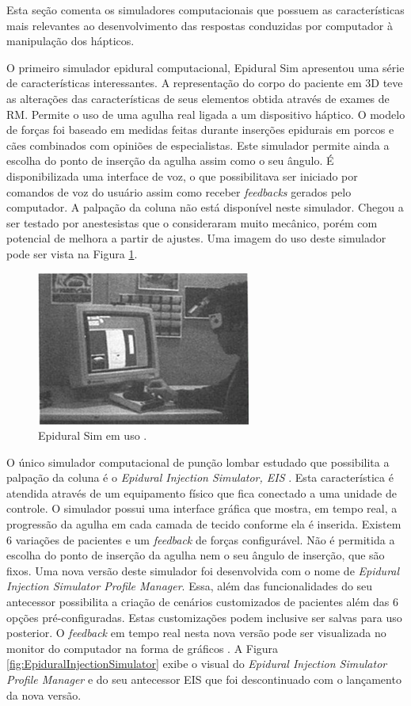 Esta seção comenta os simuladores computacionais que possuem as características mais relevantes ao desenvolvimento das respostas conduzidas por computador à manipulação dos hápticos. 

O primeiro simulador epidural computacional, Epidural Sim \cite{Stredney1996} apresentou uma série de características interessantes. A representação do corpo do paciente em 3D teve as alterações das características de seus elementos obtida através de exames de \acrfull{RM}. Permite o uso de uma agulha real ligada a um dispositivo háptico. O modelo de forças foi baseado em medidas feitas durante inserções epidurais em porcos e cães combinados com opiniões de especialistas. Este simulador permite ainda a escolha do ponto de inserção da agulha assim como o seu ângulo. É disponibilizada uma interface de voz, o que possibilitava ser iniciado por comandos de voz do usuário assim como receber \textit{feedbacks} gerados pelo computador. A palpação da coluna não está disponível neste simulador. Chegou a ser testado por anestesistas que o consideraram muito mecânico, porém com potencial de melhora a partir de ajustes. Uma imagem do uso deste simulador pode ser vista na Figura \ref{fig:epiduralSim}. 

\begin{figure}[ht!]
    \centering
    \includegraphics[width=0.3\linewidth]{capitulos/figuras/epiduralSimulator.png} 
    \caption{Epidural Sim em uso \cite{Stredney1996}.}
    \label{fig:epiduralSim}
\end{figure}

O único simulador computacional de punção lombar estudado que possibilita a palpação da coluna é o \textit{Epidural Injection Simulator, EIS} \cite{Wilson2003}. Esta característica é atendida através de um equipamento físico que fica conectado a uma unidade de controle. O simulador possui uma interface gráfica que mostra, em tempo real, a progressão da agulha em cada camada de tecido conforme ela é inserida. Existem 6 variações de pacientes e um \textit{feedback} de forças configurável. Não é permitida a escolha do ponto de inserção da agulha nem o seu ângulo de inserção, que são fixos. Uma nova versão deste simulador foi desenvolvida com o nome de \textit{Epidural Injection Simulator Profile Manager}. Essa, além das funcionalidades do seu antecessor possibilita a criação de cenários customizados de pacientes além das 6 opções pré-configuradas. Estas customizações podem inclusive ser salvas para uso posterior. O \textit{feedback} em tempo real nesta nova versão pode ser visualizada no monitor do computador na forma de gráficos \cite{CPRSavers&FirstAidSupply2018}. A Figura \ref{fig:EpiduralInjectionSimulator} exibe o visual do \textit{Epidural Injection Simulator Profile Manager} e do seu antecessor EIS que foi descontinuado com o lançamento da nova versão.

